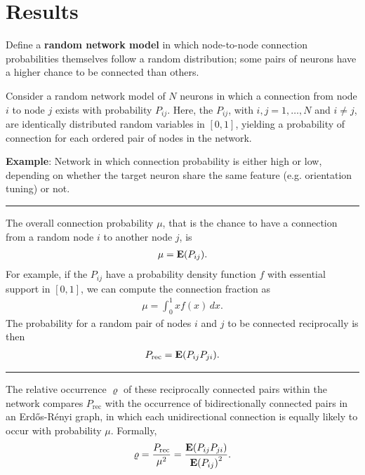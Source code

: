 
\section*{Results}

Define a \textbf{random network model} in which node-to-node connection probabilities themselves follow a random distribution; some pairs of neurons have a higher chance to be connected than others.


Consider a random network model of $N$ neurons in which a connection from node $i$ to node $j$ exists with probability $P_{ij}$.
%
Here, the $P_{ij}$, with $i,j = 1,\dots,N$ and $i \neq j$, are identically distributed random variables in $[0,1]$, yielding a probability of connection for each ordered pair of nodes in the network.

\textbf{\textcolor{gblue}{Example}}: Network in which connection probability is either high or low, depending on whether the target neuron share the same feature (e.g. orientation tuning) or not.

\begin{center}
  \rule{19cm}{2pt}
\end{center}

The overall connection probability $\mu$, that is the chance to have a connection from a random node $i$ to another node $j$, is
\begin{align}
\mu = \operatorname{\mathbf{E}}(P_{ij}).
\end{align}
For example, if the $P_{ij}$ have a probability density function $f$ with essential support in $[0,1]$, we can compute the connection fraction as
\begin{align}
  \mu = \int_0^1 x f(x)\,dx.
\end{align}
The probability for a random pair of nodes $i$ and $j$ to be connected reciprocally is then
\begin{align}
P_{\mathrm{rec}} = \operatorname{\mathbf{E}}(P_{ij} P_{ji}).
\end{align}

\begin{center}
  \rule{19cm}{2pt}
\end{center}

The relative occurrence $\varrho$ of these reciprocally connected pairs within the network compares $P_{\mathrm{rec}}$ with the occurrence of bidirectionally connected pairs in an Erd\H{o}s-R\'{e}nyi graph, in which each unidirectional connection is equally likely to occur with probability $\mu$. Formally,
\begin{align}
  \varrho = \frac{P_{\mathrm{rec}}}{\mu^2} = \frac{\E\left(P_{ij}P_{ji}\right)}{{\E\left(P_{ij}\right)}^2}.
\end{align}

